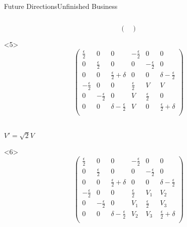 \documentclass[pdf]{beamer}
\begin{document}
\begin{frame}{Future Directions}{Unfinished Business}
\begin{columns}
\begin{column}[]{.5\textwidth}
\begin{onlyenv}
\begin{equation*}
\begin{pmatrix}
                            \end{pmatrix}
                            \end{equation*}
                        \end{onlyenv}
                        \begin{onlyenv}<5>
                            \begin{equation*}
                            \begin{pmatrix}
                                \frac{\epsilon}{2}&0&0&-\frac{\epsilon}{2}&0&0\\
                                0&\frac{\epsilon}{2}&0&0&-\frac{\epsilon}{2}&0\\
                                0&0&\frac{\epsilon}{2}+\delta&0&0&\delta-\frac{\epsilon}{2}\\
                                -\frac{\epsilon}{2}&0&0&\frac{\epsilon}{2}&V&V\\
                                0&-\frac{\epsilon}{2}&0&V&\frac{\epsilon}{2}&0\\
                                0&0&\delta-\frac{\epsilon}{2}&V&0&\frac{\epsilon}{2}+\delta\\
                            \end{pmatrix}
                            \end{equation*}
                            \\
                            \begin{center}
                            $V' = \sqrt{2}V$\end{center} 
                        \end{onlyenv}
                        \begin{onlyenv}<6>
                            \begin{equation*}
                            \begin{pmatrix}
                                \frac{\epsilon}{2}&0&0&-\frac{\epsilon}{2}&0&0\\
                                0&\frac{\epsilon}{2}&0&0&-\frac{\epsilon}{2}&0\\
                                0&0&\frac{\epsilon}{2}+\delta&0&0&\delta-\frac{\epsilon}{2}\\
                                -\frac{\epsilon}{2}&0&0&\frac{\epsilon}{2}&V_1&V_2\\
                                0&-\frac{\epsilon}{2}&0&V_1&\frac{\epsilon}{2}&V_3\\
                                0&0&\delta-\frac{\epsilon}{2}&V_2&V_3&\frac{\epsilon}{2}+\delta\\
                            \end{pmatrix}
                            \end{equation*}
                        \end{onlyenv}
                    \end{column}
                \end{columns}
            \end{frame}
\end{document}
